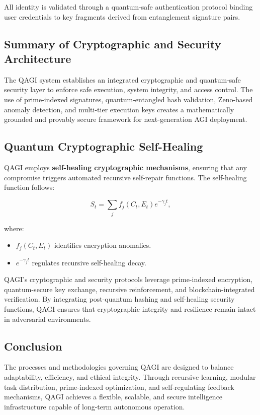 \documentclass{article}
\theoremstyle{plain}
\theoremstyle{claimstyle}
\begin{document}
All identity is validated through a quantum-safe authentication protocol binding user credentials to key fragments derived from entanglement signature pairs.

\subsection{Summary of Cryptographic and Security Architecture}

The QAGI system establishes an integrated cryptographic and quantum-safe security layer to enforce safe execution, system integrity, and access control. The use of prime-indexed signatures, quantum-entangled hash validation, Zeno-based anomaly detection, and multi-tier execution keys creates a mathematically grounded and provably secure framework for next-generation AGI deployment.


\subsection{Quantum Cryptographic Self-Healing}

QAGI employs \textbf{self-healing cryptographic mechanisms}, ensuring that any compromise triggers automated recursive self-repair functions. The self-healing function follows:

\begin{equation}
    S_t = \sum_{j} f_j(C_t, E_t) e^{-\gamma_j t},
\end{equation}

where:
\begin{itemize}
    \item \( f_j(C_t, E_t) \) identifies encryption anomalies.
    \item \( e^{-\gamma_j t} \) regulates recursive self-healing decay.
\end{itemize}

QAGI’s cryptographic and security protocols leverage prime-indexed encryption, quantum-secure key exchange, recursive reinforcement, and blockchain-integrated verification. By integrating post-quantum hashing and self-healing security functions, QAGI ensures that cryptographic integrity and resilience remain intact in adversarial environments.
\subsection{Conclusion}

The processes and methodologies governing QAGI are designed to balance adaptability, efficiency, and ethical integrity. Through recursive learning, modular task distribution, prime-indexed optimization, and self-regulating feedback mechanisms, QAGI achieves a flexible, scalable, and secure intelligence infrastructure capable of long-term autonomous operation.
\end{document}

